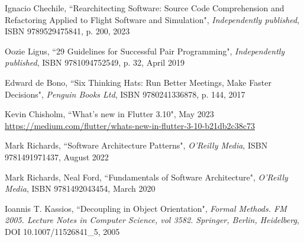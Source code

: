 \begin{thebibliography}{100}
 Ignacio Chechile, ``Rearchitecting Software: Source Code Comprehension and Refactoring 
Applied to Flight Software and Simulation", \emph{Independently published}, ISBN 9789529475841, p. 200, 2023

 Oozie Ligus, ``29 Guidelines for Successful Pair Programming", \emph{Independently published},
ISBN 9781094752549, p. 32,  April 2019

 Edward de Bono, ``Six Thinking Hats: Run Better Meetings, Make Faster Decisions",
\emph{Penguin Books Ltd}, ISBN 9780241336878, p. 144, 2017

 Kevin Chisholm, ``What's new in Flutter 3.10", May 2023
\href{https://medium.com/flutter/whats-new-in-flutter-3-10-b21db2c38c73}{https://medium.com/flutter/whats-new-in-flutter-3-10-b21db2c38c73}

 Mark Richards, ``Software Architecture Patterns", 
\emph{O'Reilly Media}, ISBN 9781491971437, August 2022

 Mark Richards, Neal Ford, ``Fundamentals of Software Architecture",
\emph{O'Reilly Media}, ISBN 9781492043454, March 2020  

 Ioannis T. Kassios, ``Decoupling in Object Orientation", \emph{Formal Methods. FM 2005. 
Lecture Notes in Computer Science, vol 3582. Springer, Berlin, Heidelberg}, DOI 10.1007/11526841\_5, 2005

\end{thebibliography}
